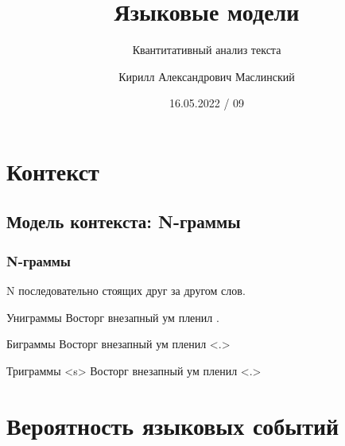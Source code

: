 \documentclass[10pt,svgnames]{beamer}
\title[QTA 09] %
{Языковые модели}
\subtitle
{Квантитативный анализ текста} %
\author%
{Кирилл Александрович Маслинский}
\institute%
{ЕУСПб}
\date%
{16.05.2022 / 09}
\begin{document}
\begin{frame}
  \titlepage
\end{frame}

\section{Контекст}


\subsection{Модель контекста: N-граммы}

\begin{frame}

  \frametitle{N-граммы}
  
  N последовательно стоящих друг за другом слов.
  
  \begin{block}{Униграммы}
    \alert<2>{Восторг} \alert<3>{внезапный} \alert<4>{ум}
    \alert<5>{пленил} .
  \end{block}

  \begin{block}{Биграммы}
  \alert<2>{Восторг} \alert<2-3>{внезапный} \alert<3-4>{ум}
  \alert<4-5>{пленил} \alert<5>{<.>}    
  \end{block}

  \begin{block}{Триграммы}
  \alert<2>{<s>}  \alert<2-3>{Восторг} \alert<2-4>{внезапный}
  \alert<3-5>{ум} \alert<4-5>{пленил} \alert<5>{<.>}
  \end{block}
\end{frame}

\section{Вероятность языковых событий}
\end{document}

